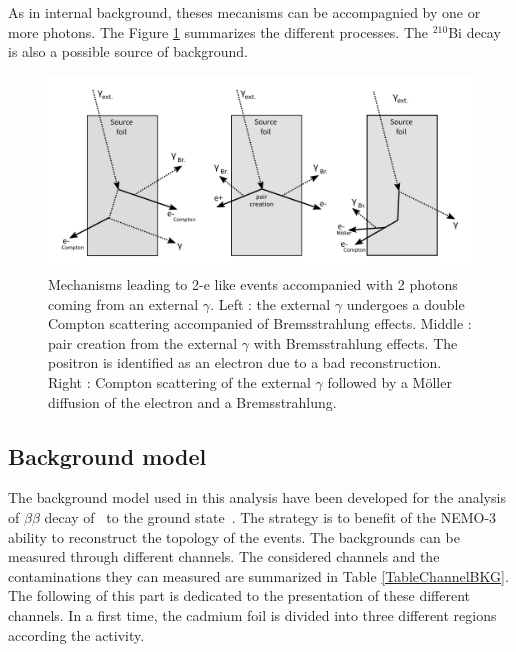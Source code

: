 \documentclass[main.tex]{subfiles}
\begin{document}
\NI As in internal background, theses mecanisms can be accompagnied by one or more photons. The Figure \ref{ExternalBkgPicture}  summarizes the different processes. The $^{\text{210}}$Bi decay is also a possible source of background.



\begin{figure}[h!]
\begin{center}
\includegraphics[scale=0.48]{pictures/Chap6/ExternalBkg.pdf}
\end{center}
\caption{Mechanisms leading to 2-e like events accompanied with 2 photons coming from an external $\gamma$. Left : the external $\gamma$ undergoes a double Compton scattering accompanied of Bremsstrahlung effects. Middle : pair creation from the external $\gamma$ with Bremsstrahlung effects. The positron is identified as an electron due to a bad reconstruction. Right : Compton scattering of the external $\gamma$ followed by a M\"oller diffusion of the electron and a Bremsstrahlung.}
\label{ExternalBkgPicture}
\end{figure}


\FloatBarrier


\subsection{Background model}


\NI The background model used in this analysis have been developed for the analysis of $\beta\beta$ decay of \Cd~to the ground state~\cite{Arnold2016bed}. The strategy is to benefit of the NEMO-3 ability to reconstruct the topology of the events. The backgrounds can be measured through different channels. The considered channels and the contaminations they can measured are summarized in Table \ref{TableChannelBKG}. The following of this part is dedicated to the presentation of these different channels. In a first time, the cadmium foil is divided into three different regions according the activity. 
\end{document}
